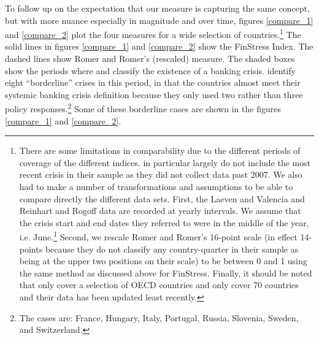 \documentclass[]{article}
\begin{document}

To follow up on the expectation that our measure is capturing the same concept, but with more nuance especially in magnitude and over time, figures \ref{compare_1} and \ref{compare_2} plot the four measures for a wide selection of countries.\footnote{There are some limitations in comparability due to the different periods of coverage of the different indices. \cite{Romer2015} in particular largely do not include the most recent crisis in their sample as they did not collect data past 2007. We also had to make a number of transformations and assumptions to be able to  compare directly the different data sets. First, the Laeven and Valencia and Reinhart and Rogoff data are recorded at yearly intervals. We assume that the crisis start and end dates they referred to were in the middle of the year, i.e. June.\footnote{In the period covered in figures \ref{compare_1} and \ref{compare_2} this improves their fit with events, as many of the 2008 crises became especially apparent after Lehman Brothers collapse in September 2008.} Second, we rescale Romer and Romer's 16-point scale (in effect 14-points because they do not classify any country-quarter in their sample as being at the upper two positions on their scale) to be between 0 and 1 using the same method as discussed above for FinStress. Finally, it should be noted that \cite{Romer2015} only cover a selection of OECD countries and \cite{Reinhart2009} only cover 70 countries and their data has been updated least recently.} The solid lines in figures \ref{compare_1} and \ref{compare_2} show the FinStress Index. The dashed lines show Romer and Romer's (rescaled) measure. The shaded boxes show the periods where \cite{laeven2013} and \cite{Reinhart2009} classify the existence of a banking crisis. \cite{laeven2013} identify eight ``borderline'' crises in this period, in that the countries almost meet their systemic banking crisis definition because they only used two rather than three policy responses.\footnote{The cases are: France, Hungary, Italy, Portugal, Russia, Slovenia, Sweden, and Switzerland.} Some of these borderline cases are shown in the figures \ref{compare_1} and \ref{compare_2}.
\end{document}

